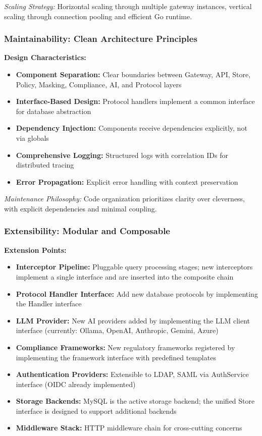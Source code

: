 \textit{Scaling Strategy:} Horizontal scaling through multiple gateway instances, vertical scaling through connection pooling and efficient Go runtime.

\subsubsection{Maintainability: Clean Architecture Principles}

\textbf{Design Characteristics:}
\begin{itemize}[leftmargin=*]
    \item \textbf{Component Separation:} Clear boundaries between Gateway, API, Store, Policy, Masking, Compliance, AI, and Protocol layers
    \item \textbf{Interface-Based Design:} Protocol handlers implement a common interface for database abstraction
    \item \textbf{Dependency Injection:} Components receive dependencies explicitly, not via globals
    \item \textbf{Comprehensive Logging:} Structured logs with correlation IDs for distributed tracing
    \item \textbf{Error Propagation:} Explicit error handling with context preservation
\end{itemize}

\textit{Maintenance Philosophy:} Code organization prioritizes clarity over cleverness, with explicit dependencies and minimal coupling.

\subsubsection{Extensibility: Modular and Composable}

\textbf{Extension Points:}
\begin{itemize}[leftmargin=*]
    \item \textbf{Interceptor Pipeline:} Pluggable query processing stages; new interceptors implement a single interface and are inserted into the composite chain
    \item \textbf{Protocol Handler Interface:} Add new database protocols by implementing the Handler interface
    \item \textbf{LLM Provider:} New AI providers added by implementing the LLM client interface (currently: Ollama, OpenAI, Anthropic, Gemini, Azure)
    \item \textbf{Compliance Frameworks:} New regulatory frameworks registered by implementing the framework interface with predefined templates
    \item \textbf{Authentication Providers:} Extensible to LDAP, SAML via AuthService interface (OIDC already implemented)
    \item \textbf{Storage Backends:} MySQL is the active storage backend; the unified Store interface is designed to support additional backends
    \item \textbf{Middleware Stack:} HTTP middleware chain for cross-cutting concerns
\end{itemize}

